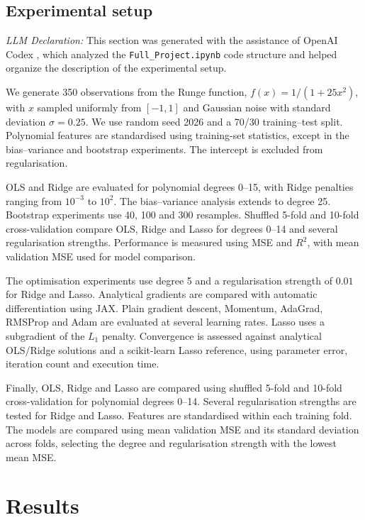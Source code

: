 \documentclass[aps,rmp,reprint,raggedbottom,amsmath,amssymb,longbibliography]{revtex4-1}
\begin{document}
\subsection{Experimental setup}
\noindent\textit{LLM Declaration:} This section was generated with the assistance of OpenAI Codex \cite{Codex}, which analyzed the \texttt{Full\_Project.ipynb}\cite{Timholmen96FYSSTK4155Prosjektarbeid} code structure and helped organize the description of the experimental setup.

We generate 350 observations from the Runge function,
$f(x)=1/(1+25x^2)$, with $x$ sampled uniformly from $[-1,1]$
and Gaussian noise with standard deviation $\sigma=0.25$.
We use random seed 2026 and a 70/30 training--test split.
Polynomial features are standardised using training-set statistics,
except in the bias--variance and bootstrap experiments.
The intercept is excluded from regularisation.

OLS and Ridge are evaluated for polynomial degrees 0--15,
with Ridge penalties ranging from $10^{-3}$ to $10^2$.
The bias--variance analysis extends to degree 25.
Bootstrap experiments use 40, 100 and 300 resamples.
Shuffled 5-fold and 10-fold cross-validation compare OLS, Ridge
and Lasso for degrees 0--14 and several regularisation strengths.
Performance is measured using MSE and $R^2$, with mean validation
MSE used for model comparison.

The optimisation experiments use degree 5 and a regularisation
strength of $0.01$ for Ridge and Lasso.
Analytical gradients are compared with automatic differentiation
using JAX. Plain gradient descent, Momentum, AdaGrad, RMSProp
and Adam are evaluated at several learning rates.
Lasso uses a subgradient of the $L_1$ penalty.
Convergence is assessed against analytical OLS/Ridge solutions
and a scikit-learn Lasso reference, using parameter error,
iteration count and execution time.

Finally, OLS, Ridge and Lasso are compared using shuffled
5-fold and 10-fold cross-validation for polynomial degrees 0--14.
Several regularisation strengths are tested for Ridge and Lasso.
Features are standardised within each training fold.
The models are compared using mean validation MSE and its
standard deviation across folds, selecting the degree and
regularisation strength with the lowest mean MSE.
\clearpage
\section{Results}
\end{document}
